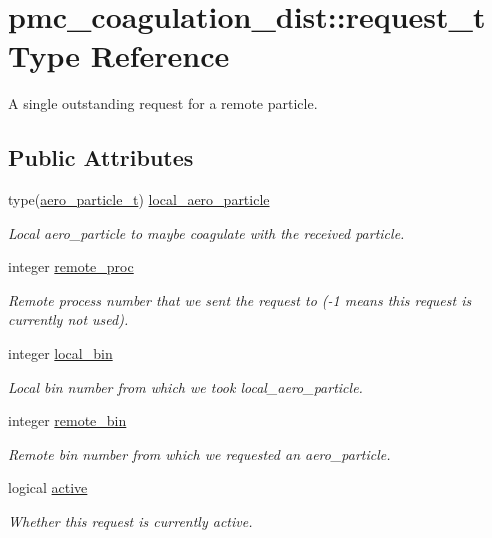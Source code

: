 \hypertarget{structpmc__coagulation__dist_1_1request__t}{}\section{pmc\+\_\+coagulation\+\_\+dist\+:\+:request\+\_\+t Type Reference}
\label{structpmc__coagulation__dist_1_1request__t}


A single outstanding request for a remote particle.  


\subsection*{Public Attributes}
\begin{DoxyCompactItemize}
\item 
type(\mbox{\hyperlink{structpmc__aero__particle_1_1aero__particle__t}{aero\+\_\+particle\+\_\+t}}) \mbox{\hyperlink{structpmc__coagulation__dist_1_1request__t_a31ee25126fc60521c2c352b26fadedba}{local\+\_\+aero\+\_\+particle}}
\begin{DoxyCompactList}\small\item\em Local {\ttfamily aero\+\_\+particle} to maybe coagulate with the received particle. \end{DoxyCompactList}\item 
integer \mbox{\hyperlink{structpmc__coagulation__dist_1_1request__t_aa41b064c79fe13f3e8d37f738ad7a791}{remote\+\_\+proc}}
\begin{DoxyCompactList}\small\item\em Remote process number that we sent the request to (-\/1 means this request is currently not used). \end{DoxyCompactList}\item 
integer \mbox{\hyperlink{structpmc__coagulation__dist_1_1request__t_aaa71dcd19295a8a5292d0bb53d682777}{local\+\_\+bin}}
\begin{DoxyCompactList}\small\item\em Local bin number from which we took {\ttfamily local\+\_\+aero\+\_\+particle}. \end{DoxyCompactList}\item 
integer \mbox{\hyperlink{structpmc__coagulation__dist_1_1request__t_a3191ea00279ecffb3a14c4e4ecc325b3}{remote\+\_\+bin}}
\begin{DoxyCompactList}\small\item\em Remote bin number from which we requested an {\ttfamily aero\+\_\+particle}. \end{DoxyCompactList}\item 
logical \mbox{\hyperlink{structpmc__coagulation__dist_1_1request__t_a979934a887e662d8f32e8042aae139bd}{active}}
\begin{DoxyCompactList}\small\item\em Whether this request is currently active. \end{DoxyCompactList}\end{DoxyCompactItemize}


